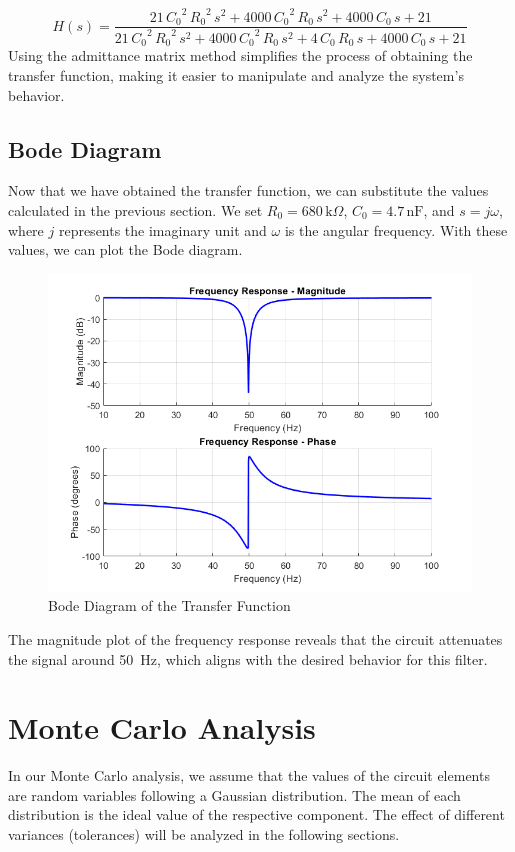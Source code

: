 \documentclass[hidelinks,12pt]{article}
\begin{document}
	$$
	H(s) = 
	\frac{21\,{C_0 }^2 \,{R_0 }^2 \,s^2 + 4000\,{C_0 }^2 \,R_0 \,s^2 + 4000\,C_0 \,s + 21}{21\,{C_0 }^2 \,{R_0 }^2 \,s^2 + 4000\,{C_0 }^2 \,R_0 \,s^2 + 4\,C_0 \,R_0 \,s + 4000\,C_0 \,s + 21}
	$$
	\newline
	Using the admittance matrix method simplifies the process of obtaining the transfer function, making it easier to manipulate and analyze the system’s behavior.
			
	\pagebreak
	
	\subsection{Bode Diagram}
		Now that we have obtained the transfer function, we can substitute the values calculated in the previous section. We set $R_0 = 680\,\text{k}\Omega$, $C_0 = 4.7\,\text{nF}$, and $s = j\omega$, where \( j \) represents the imaginary unit and \( \omega \) is the angular frequency. With these values, we can plot the Bode diagram.

		\begin{figure}[!h]
			\centering
			\includegraphics[scale=0.8]{figures/bode_diagram.png}
			\caption{Bode Diagram of the Transfer Function}
		\end{figure}

	The magnitude plot of the frequency response reveals that the circuit attenuates the signal around 50~Hz, which aligns with the desired behavior for this filter.
	

	
	\pagebreak
	
	\section{Monte Carlo Analysis}
	In our Monte Carlo analysis, we assume that the values of the circuit elements are random variables following a Gaussian distribution. The mean of each distribution is the ideal value of the respective component. The effect of different variances (tolerances) will be analyzed in the following sections.
	
\end{document}

